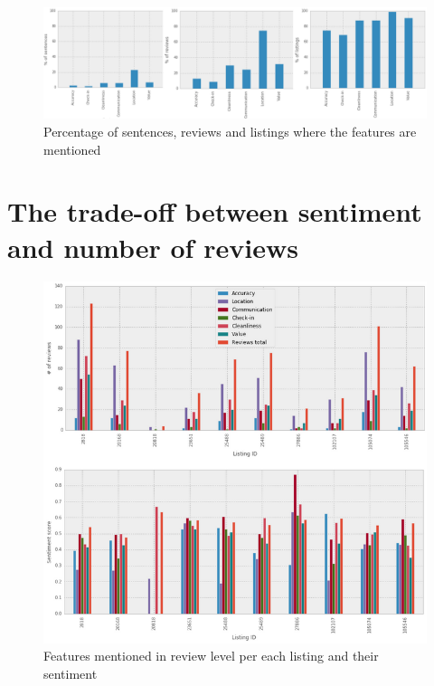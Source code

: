 \begin{figure}[h!]
\centering
	\includegraphics[height=0.2\textheight]{feature_mentioned}
	\caption{Percentage of sentences, reviews and listings where the features are mentioned}
	\label{fig:fea}
\end{figure} 
%
%
%
\section{The trade-off between sentiment and number of reviews}
%
%
\begin{figure}[h!]
	\includegraphics[height=0.67\textheight]{features_sentiment}
	\caption{Features mentioned in review level per each listing and their sentiment}
	\label{fig:feasent}
\end{figure}
